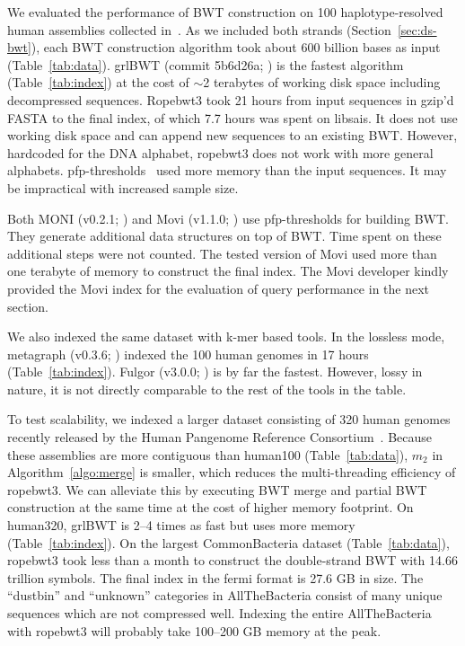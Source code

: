 \documentclass[webpdf,contemporary,large,namedate]{oup-authoring-template}%
\begin{document}
We evaluated the performance of BWT construction on 100 haplotype-resolved human assemblies collected in~\citet{Li:2024ab}.
As we included both strands (Section~\ref{sec:ds-bwt}), each BWT construction algorithm took about 600 billion bases as input (Table~\ref{tab:data}).
grlBWT (commit 5b6d26a; \citealt*{DBLP:journals/iandc/DiazDominguezN23}) is the fastest algorithm (Table~\ref{tab:index})
at the cost of $\sim$2 terabytes of working disk space including decompressed sequences.
Ropebwt3 took 21 hours from input sequences in gzip'd FASTA to the final index, of which 7.7 hours was spent on libsais.
It does not use working disk space and can append new sequences to an existing BWT.
However, hardcoded for the DNA alphabet, ropebwt3 does not work with more general alphabets.
pfp-thresholds~\citep{Rossi:2022aa} used more memory than the input sequences.
It may be impractical with increased sample size.

Both MONI (v0.2.1; \citealt*{Rossi:2022aa}) and Movi (v1.1.0; \citealt*{Zakeri:2024aa}) use pfp-thresholds for building BWT.
They generate additional data structures on top of BWT.
Time spent on these additional steps were not counted.
The tested version of Movi used more than one terabyte of memory to construct the final index.
The Movi developer kindly provided the Movi index for the evaluation of query performance in the next section.

We also indexed the same dataset with k-mer based tools.
In the lossless mode, metagraph (v0.3.6; \citealt*{Karasikov2020.10.01.322164}) indexed the 100 human genomes in 17 hours (Table~\ref{tab:index}).
Fulgor (v3.0.0; \citealt*{Fan:2024aa}) is by far the fastest.
However, lossy in nature, it is not directly comparable to the rest of the tools in the table.

To test scalability, we indexed a larger dataset consisting of 320 human genomes recently released by the Human Pangenome Reference Consortium~\citep{Liao:2023aa}.
Because these assemblies are more contiguous than human100 (Table~\ref{tab:data}), $m_2$ in Algorithm~\ref{algo:merge} is smaller, which reduces the multi-threading efficiency of ropebwt3.
We can alleviate this by executing BWT merge and partial BWT construction at the same time at the cost of higher memory footprint.
On human320, grlBWT is 2--4 times as fast but uses more memory (Table~\ref{tab:index}).
On the largest CommonBacteria dataset (Table~\ref{tab:data}),
ropebwt3 took less than a month to construct the double-strand BWT with 14.66 trillion symbols.
The final index in the fermi format is 27.6 GB in size.
The ``dustbin'' and ``unknown'' categories in AllTheBacteria consist of many unique sequences which are not compressed well.
Indexing the entire AllTheBacteria with ropebwt3 will probably take 100--200 GB memory at the peak.
\end{document}
